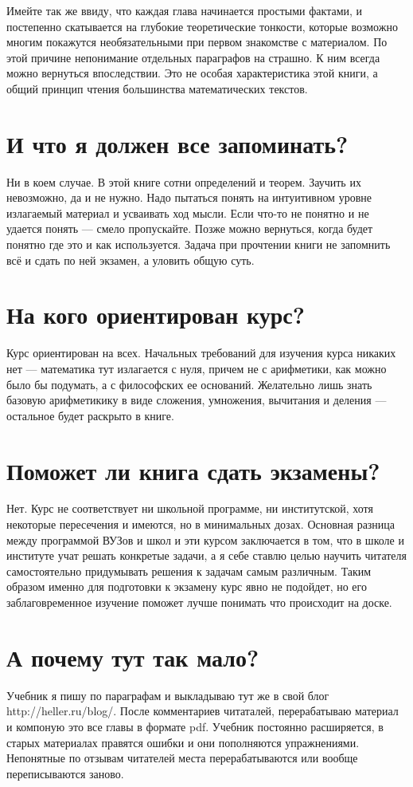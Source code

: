 Имейте так же ввиду, что каждая глава начинается простыми фактами, и постепенно скатывается на глубокие теоретические тонкости, которые возможно многим покажутся необязательными при первом знакомстве с материалом. По этой причине непонимание отдельных параграфов на страшно. К ним всегда можно вернуться впоследствии. Это не особая характеристика этой книги, а общий принцип чтения большинства математических текстов.

\section*{И что я должен все запоминать?}
Ни в коем случае. В этой книге сотни определений и теорем. Заучить их невозможно, да и не нужно. Надо пытаться понять на интуитивном уровне излагаемый материал и усваивать ход мысли. Если что-то не понятно и не удается понять --- смело пропускайте. Позже можно вернуться, когда будет понятно где это и как используется. Задача при прочтении книги не запомнить всё и сдать по ней экзамен, а уловить общую суть.

\section*{На кого ориентирован курс?}
Курс ориентирован на всех. Начальных требований для изучения курса никаких нет --- математика тут излагается с нуля, причем не с арифметики, как можно было бы подумать, а с философских ее оснований. Желательно лишь знать базовую арифметикику в виде сложения, умножения, вычитания и деления --- остальное будет раскрыто в книге.

\section*{Поможет ли книга сдать экзамены?}
Нет. Курс не соответствует ни школьной программе, ни институтской, хотя некоторые пересечения и имеются, но в минимальных дозах. Основная разница между программой ВУЗов и школ и эти курсом заключается в том, что в школе и институте учат решать конкретые задачи, а я себе ставлю целью научить читателя самостоятельно придумывать решения к задачам самым различным. Таким образом именно для подготовки к экзамену курс явно не подойдет, но его заблаговременное изучение поможет лучше понимать что происходит на доске.

\section*{А почему тут так мало?}
Учебник я пишу по параграфам и выкладываю тут же в свой блог http://heller.ru/blog/. После комментариев читаталей, перерабатываю материал и компоную это все главы в формате pdf. Учебник постоянно расширяется, в старых материалах правятся ошибки и они пополняются упражнениями. Непонятные по отзывам читателей места перерабатываются или вообще переписываются заново.

